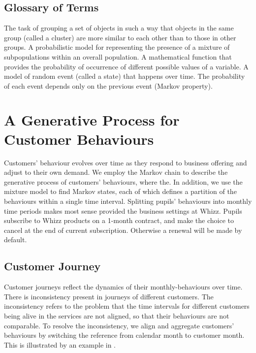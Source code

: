 \documentclass[english,a4,oneside,9pt]{extarticle}
\begin{document}
\subsection*{Glossary of Terms}

\begin{infommitemize}
	 The task of grouping a set of objects in such a way that objects in the same group (called a cluster) are more similar to each other than to those in other groups.
	 A probabilistic model for representing the presence of a mixture of subpopulations within an overall population.
	 A mathematical function that provides the probability of occurrence of different possible values of a variable.
	 A model of random event (called a state) that happens over time. The probability of each event depends only on the previous event (Markov property).
\end{infommitemize}

\section{A Generative Process for Customer Behaviours}

Customers' behaviour evolves over time as they respond to business offering and adjust to their own demand. We employ the Markov chain to describe the generative process of customers' behaviours, where the. In addition, we use the mixture model to find Markov states, each of which defines a partition of the behaviours within a single time interval. Splitting pupils' behaviours into monthly time periods makes most sense provided the business settings at Whizz. Pupils subscribe to Whizz products on a 1-month contract, and make the choice to cancel at the end of current subscription. Otherwise a renewal will be made by default.

\subsection*{Customer Journey}


Customer journeys reflect the dynamics of their monthly-behaviours over time. There is inconsistency present in journeys of different customers. The inconsistency refers to the problem that the time intervals for different customers being alive in the services are not aligned, so that their behaviours are not comparable. To resolve the inconsistency, we align and aggregate customers' behaviours by switching the reference from calendar month to customer month. This is illustrated by an example in .
\end{document}
